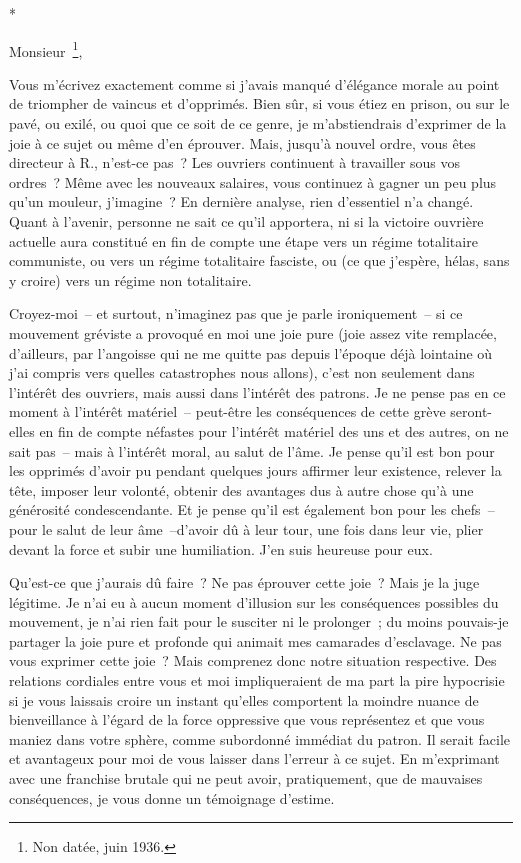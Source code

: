 \documentclass[french,twoside]{book} %
\begin{document}
\begin{center}
*\end{center}
\noindent Monsieur \footnote{Non datée, juin 1936.},\par
Vous m'écrivez exactement comme si j'avais manqué d'élégance morale au point de triompher de vaincus et d'opprimés. Bien sûr, si vous étiez en prison, ou sur le pavé, ou exilé, ou quoi que ce soit de ce genre, je m'abstiendrais d'exprimer de la joie à ce sujet ou même d'en éprouver. Mais, jusqu'à nouvel ordre, vous êtes directeur à R., n'est-ce pas ? Les ouvriers continuent à travailler sous vos ordres ? Même avec les nouveaux salaires, vous continuez à gagner un peu plus qu'un mouleur, j'imagine ? En dernière analyse, rien d'essentiel n'a changé. Quant à l'avenir, personne ne sait ce qu'il apportera, ni si la victoire ouvrière actuelle aura constitué en fin de compte une étape vers un régime totalitaire communiste, ou vers un régime totalitaire fasciste, ou (ce que j'espère, hélas, sans y croire) vers un régime non totalitaire.\par
Croyez-moi – et surtout, n'imaginez pas que je parle ironiquement – si ce mouvement gréviste a provoqué en moi une joie pure (joie assez vite remplacée, d'ailleurs, par l'angoisse qui ne me quitte pas depuis l'époque déjà lointaine où j'ai compris vers quelles catastrophes nous allons), c'est non seulement dans l'intérêt des ouvriers, mais aussi dans l'intérêt des patrons. Je ne pense pas en ce moment à l'intérêt matériel – peut-être les conséquences de cette grève seront-elles en fin de compte néfastes pour l'intérêt matériel des uns et des autres, on ne sait pas – mais à l'intérêt moral, au salut de l'âme. Je pense qu'il est bon pour les opprimés d'avoir pu pendant quelques jours affirmer leur existence, relever la tête, imposer leur volonté, obtenir des avantages dus à autre chose qu'à une générosité condescendante. Et je pense qu'il est également bon pour les chefs – pour le salut de leur âme –d'avoir dû à leur tour, une fois dans leur vie, plier devant la force et subir une humiliation. J'en suis heureuse pour eux.\par
Qu'est-ce que j'aurais dû faire ? Ne pas éprouver cette joie ? Mais je la juge légitime. Je n'ai eu à aucun moment d'illusion sur les conséquences possibles du mouvement, je n'ai rien fait pour le susciter ni le prolonger ; du moins pouvais-je partager la joie pure et profonde qui animait mes camarades d'esclavage. Ne pas vous exprimer cette joie ? Mais comprenez donc notre situation respective. Des relations cordiales entre vous et moi impliqueraient de ma part la pire hypocrisie si je vous laissais croire un instant qu'elles comportent la moindre nuance de bienveillance à l'égard de la force oppressive que vous représentez et que vous maniez dans votre sphère, comme subordonné immédiat du patron. Il serait facile et avantageux pour moi de vous laisser dans l'erreur à ce sujet. En m'exprimant avec une franchise brutale qui ne peut avoir, pratiquement, que de mauvaises conséquences, je vous donne un témoignage d'estime.\par
\end{document}
